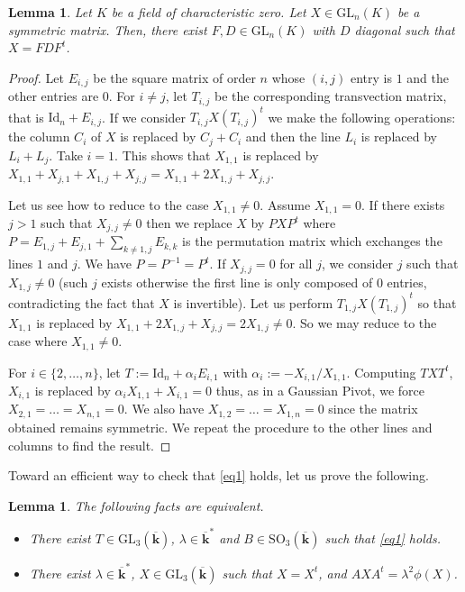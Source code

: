 \documentclass[a4paper,11pt]{amsart}
\newtheorem{lem}[thm]{Lemma}
\begin{document}
 \begin{lem}\label{lem4}
 Let $K$ be a field of characteristic zero.   
Let $X\in \mathrm{GL}_n (K)$ be a symmetric matrix. Then, there exist $F,D\in \mathrm{GL}_n (K)$ with $D$ diagonal such that $X=FDF^t$. 
 \end{lem}
 
 \begin{proof}
 Let $E_{i,j}$ be the square matrix of order $n$ whose $(i,j)$ entry is $1$ and the other entries are $0$. 
For $i\neq j$, let $T_{i,j}$ be the corresponding  transvection matrix, that is $\mathrm{Id}_n+E_{i,j}$. 
If we consider 
$T_{i,j}X(T_{i,j})^{t}$ we make the following operations: the column $C_i$ of $X$ is replaced by $C_{j}+C_i$ and then the line $L_i$ is replaced by $L_{i}+L_j$. Take $i=1$. This shows that $X_{1,1}$ is replaced by $X_{1,1}+X_{j,1}+X_{1,j} +X_{j,j}=X_{1,1}+2X_{1,j}+X_{j,j}$. \par 
Let us see how to reduce to the case $X_{1,1}\neq 0$.  Assume $X_{1,1}=0$. If there exists $j>1$ such that $X_{j,j}\neq 0$ then we replace $X$ by $PXP^t$ where $P = E_{1,j} + E_{j,1} + \sum\limits_{k\neq 1,j}E_{k,k}$ is the permutation matrix which exchanges the lines $1$ and $j$. We have $P= P^{-1} = P^{t}$. If $X_{j,j}=0$ for all $j$, we consider $j$ such that $X_{1,j}\neq 0$ (such $j$ exists otherwise the first line is only composed of $0$ entries, contradicting  the fact that $X$ is invertible).  Let us perform 
$T_{1,j}X(T_{1,j})^{t}$ so that $X_{1,1}$ is replaced by $X_{1,1}+2X_{1,j}+X_{j,j}=2X_{1,j}\neq 0$.   So we may reduce to the case where $X_{1,1}\neq 0$. \par 
For $i\in \lbrace 2,\ldots,n\rbrace$, let $T  := \mathrm{Id}_n + \alpha_i E_{i,1}$ with $\alpha_i:=- X_{i,1}/X_{1,1}$. Computing $TXT^{t}$, $X_{i,1}$ is replaced by  $\alpha_i X_{1,1} + X_{i,1} = 0$ thus, as in a Gaussian Pivot, we force $X_{2,1}=\dots =X_{n,1}=0$. We also have  $X_{1,2}=\dots =X_{1,n}=0$ since the matrix obtained remains symmetric.  We repeat the procedure to  the other lines and columns to find the result. 
 \end{proof}
 
 Toward an efficient way to check that \eqref{eq1} holds,  let us prove the following. 
 
 \begin{lem}\label{lem6}
The following facts are equivalent. 
\begin{itemize}
\item There exist $T\in \mathrm{GL}_3(\overline{\mathbf{k}})$,  $\lambda \in \overline{\mathbf{k}}^*$  and $B\in  \mathrm{SO}_3(\overline{\mathbf{k}})$ such that \eqref{eq1} holds. 
\item There exist $\lambda \in \overline{\mathbf{k}}^* $,  $X\in \mathrm{GL}_3(\overline{\mathbf{k}})$ such that $X=X^t$,  and  $A XA^t =\lambda^2\phi(X)$.
\end{itemize}
\end{lem}
\end{document}
